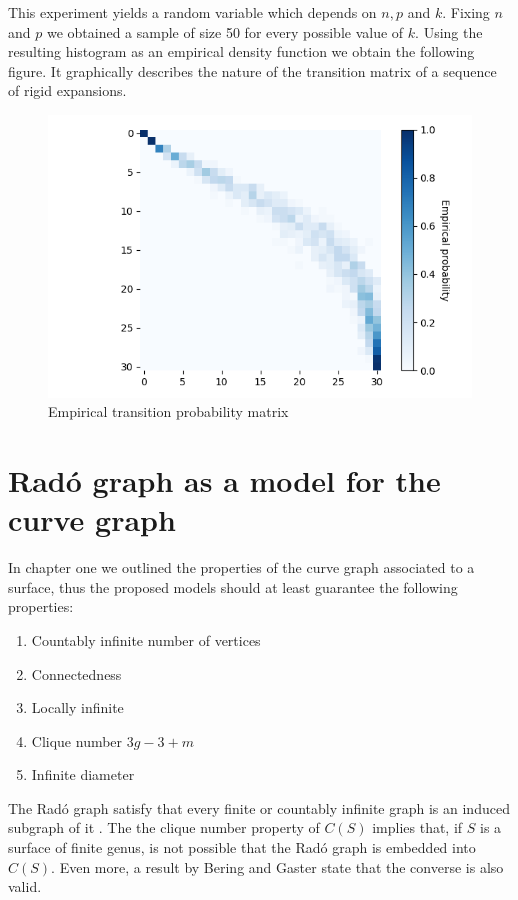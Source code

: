 This experiment yields a random variable which depends on $n, p$ and $k$. Fixing $n$ and $p$ we obtained a sample of size 50 for every possible value of $k$. Using the resulting histogram as an empirical density function we obtain the following figure. It graphically describes the nature of the transition matrix of a sequence of rigid expansions.

\begin{figure}[h!]
	\centering
	\includegraphics[scale=0.7]{Python/Figures/Transition-matrix-secuence-of-rigid-expansions.png}
	\caption{Empirical transition probability matrix}
\end{figure}

\section{Radó graph as a model for the curve graph}

In chapter one we outlined the properties of the curve graph associated to a surface, thus the proposed models should at least guarantee the following properties:

\begin{enumerate}
\item Countably infinite number of vertices
\item Connectedness
\item Locally infinite
\item Clique number $3g-3+m$
\item Infinite diameter
\end{enumerate}

The Radó graph satisfy that every finite or countably infinite graph is an induced subgraph of it \cite[Cameron 97]{theRandomGraph}. The the clique number property of $C(S)$ implies that, if $S$ is a surface of finite genus, is not possible that the Radó graph is embedded into $C(S)$. Even more, a result by Bering and Gaster \cite[Bering, Gaster 17]{beringGaster} state that the converse is also valid.

